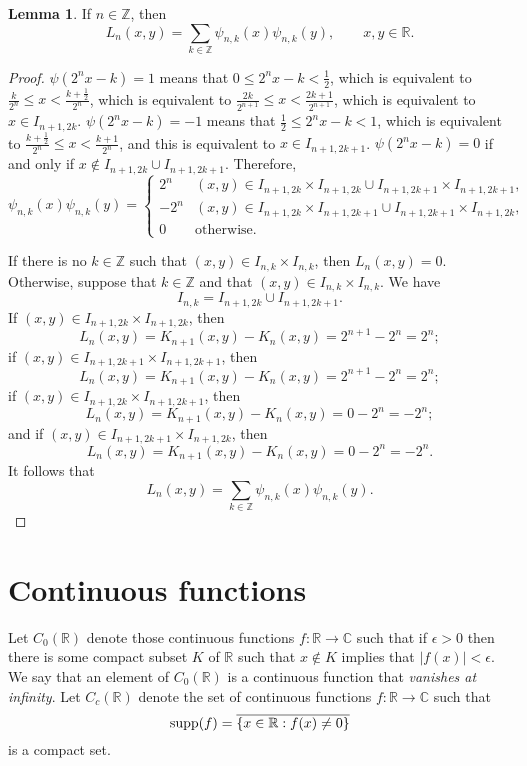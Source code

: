 \documentclass{article}
\newcommand{\supp}{\ensuremath\mathrm{supp}}
\theoremstyle{definition}
\newtheorem{lemma}[theorem]{Lemma}
\theoremstyle{definition}
\begin{document}
\begin{lemma}
If $n \in \mathbb{Z}$, then
\[
L_n(x,y) = \sum_{k \in \mathbb{Z}} \psi_{n,k}(x) \psi_{n,k}(y), \qquad x, y \in \mathbb{R}.
\]
\label{Lnformula}
\end{lemma}
\begin{proof}
$\psi(2^nx-k)=1$ means that $0\leq 2^nx-k< \frac{1}{2}$, which is equivalent to 
$\frac{k}{2^n} \leq  x < \frac{k+\frac{1}{2}}{2^n}$, which is equivalent to $\frac{2k}{2^{n+1}} \leq x < \frac{2k+1}{2^{n+1}}$,
which is equivalent to $x \in I_{n+1,2k}$.
$\psi(2^nx-k)=-1$ means that $\frac{1}{2} \leq 2^nx-k < 1$, which
is equivalent to $\frac{k+\frac{1}{2}}{2^n} \leq x < \frac{k+1}{2^n}$, and this is equivalent to $x \in I_{n+1,2k+1}$.
$\psi(2^nx-k)=0$ if and only if $x \not \in  I_{n+1,2k} \cup I_{n+1,2k+1}$.
Therefore, 
\[
\psi_{n,k}(x)\psi_{n,k}(y)=
\begin{cases}
2^n&(x,y) \in I_{n+1,2k} \times I_{n+1,2k} \cup I_{n+1,2k+1} \times I_{n+1,2k+1},\\
-2^n&(x,y) \in I_{n+1,2k} \times  I_{n+1,2k+1} \cup  I_{n+1,2k+1} \times  I_{n+1,2k},\\
0&\mathrm{otherwise.}
\end{cases}
\]


If there is no $k \in \mathbb{Z}$ such that $(x,y) \in I_{n,k} \times I_{n,k}$, then $L_n(x,y)=0$. Otherwise, suppose that $k \in \mathbb{Z}$ and that
$(x,y) \in I_{n,k} \times I_{n,k}$. We have
\[
I_{n,k} = I_{n+1,2k} \cup I_{n+1,2k+1}.
\]
If $(x,y) \in I_{n+1,2k} \times I_{n+1,2k}$, then
\[
L_n(x,y)=K_{n+1}(x,y)-K_n(x,y)=2^{n+1}-2^n=2^n;
\]
if $(x,y) \in I_{n+1,2k+1} \times I_{n+1,2k+1}$, then
\[
L_n(x,y)=K_{n+1}(x,y)-K_n(x,y)=2^{n+1}-2^n=2^n;
\]
if $(x,y) \in I_{n+1,2k} \times I_{n+1,2k+1}$, then
\[
L_n(x,y)=K_{n+1}(x,y)-K_n(x,y)=0-2^n=-2^n;
\]
and if $(x,y) \in  I_{n+1,2k+1}  \times I_{n+1,2k}$, then
\[
L_n(x,y)=K_{n+1}(x,y)-K_n(x,y)=0-2^n=-2^n.
\]
It follows that 
\[
L_n(x,y)=\sum_{k \in \mathbb{Z}} \psi_{n,k}(x)\psi_{n,k}(y).
\]
\end{proof}




\section{Continuous functions}
Let $C_0(\mathbb{R})$ denote those continuous functions $f:\mathbb{R} \to \mathbb{C}$ such that if $\epsilon>0$ then there is some compact
subset $K$ of $\mathbb{R}$ such that $x \not \in K$ implies that $|f(x)|<\epsilon$.
We say that an element of $C_0(\mathbb{R})$ is a continuous function that {\em vanishes at infinity}.
Let $C_c(\mathbb{R})$ denote the set of continuous functions
$f:\mathbb{R} \to \mathbb{C}$ such that
\[
\supp(f) = \overline{\{x \in \mathbb{R}:f(x) \neq 0\}}
\]
is a compact set.
\end{document}
